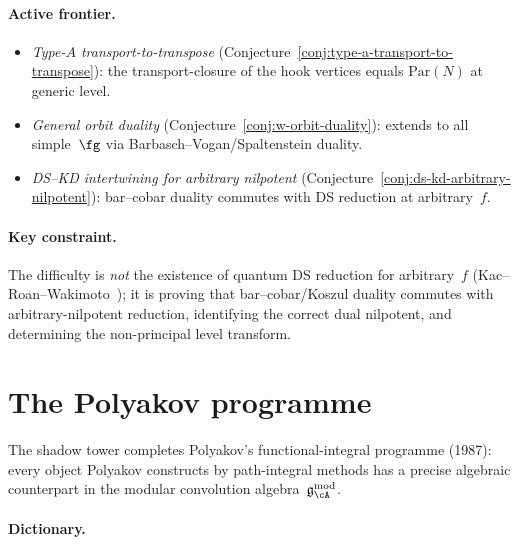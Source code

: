\paragraph{Active frontier.}
\begin{itemize}
\item \emph{Type-$A$ transport-to-transpose}
  (Conjecture~\ref{conj:type-a-transport-to-transpose}):
  the transport-closure of the hook vertices equals
  $\mathrm{Par}(N)$ at generic level.
\item \emph{General orbit duality}
  (Conjecture~\ref{conj:w-orbit-duality}):
  extends to all simple~$\fg$ via Barbasch--Vogan/Spaltenstein
  duality.
\item \emph{DS--KD intertwining for arbitrary nilpotent}
  (Conjecture~\ref{conj:ds-kd-arbitrary-nilpotent}):
  bar--cobar duality commutes with DS reduction at arbitrary~$f$.
\end{itemize}

\paragraph{Key constraint.}
The difficulty is \emph{not} the existence of quantum DS
reduction for arbitrary~$f$ (Kac--Roan--Wakimoto~\cite{KRW});
it is proving that bar--cobar/Koszul duality commutes with
arbitrary-nilpotent reduction, identifying the correct dual
nilpotent, and determining the non-principal level transform.


\section{The Polyakov programme}
\label{sec:concordance-polyakov-programme}

The shadow tower completes Polyakov's functional-integral programme
(1987): every object Polyakov constructs by path-integral methods
has a precise algebraic counterpart in the modular convolution
algebra~$\mathfrak{g}^{\mathrm{mod}}_\cA$.

\paragraph{Dictionary.}

